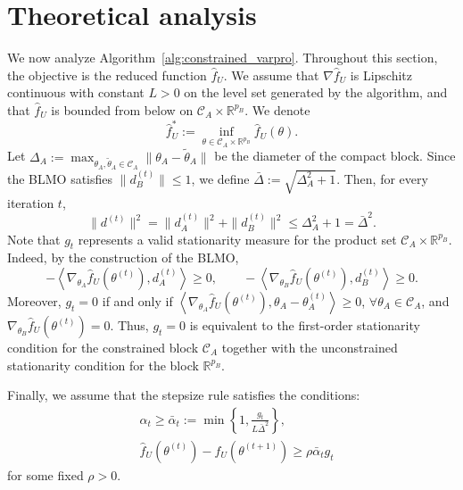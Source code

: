 \documentclass{article}
\begin{document}
\section{Theoretical analysis}
\label{sec:main}
We now analyze Algorithm~\ref{alg:constrained_varpro}. Throughout this section, the objective
is the reduced function \(\widehat f_U\). We assume that \(\nabla \widehat f_U\) is Lipschitz continuous
with constant \(L>0\) on the level set generated by the algorithm, and that \(\widehat f_U\) is
bounded from below on \(\mathcal C_A\times \mathbb{R}^{p_B}\). We denote
\[
    \widehat f_U^*
    :=
    \inf_{\theta\in \mathcal C_A\times \mathbb{R}^{p_B}}
    \widehat f_U(\theta).
\]
Let $    \Delta_A:=\max_{\theta_A,\tilde\theta_A\in \mathcal C_A}\|\theta_A-\tilde\theta_A\|$
be the diameter of the compact block. Since the BLMO satisfies $\|d_B^{(t)}\|\le 1$, 
we define $    \bar\Delta := \sqrt{\Delta_A^2+1}$.
Then, for every iteration \(t\),
\[
    \|d^{(t)}\|^2
    =
    \|d_A^{(t)}\|^2+\|d_B^{(t)}\|^2
    \le
    \Delta_A^2+1
    =
    \bar\Delta^2.
\] 
Note that $g_t$ represents a valid stationarity measure for the product set
\(\mathcal C_A\times \mathbb{R}^{p_B}\). Indeed, by the construction of the BLMO,
\[
    -
    \left\langle
        \nabla_{\theta_A}\widehat f_U(\theta^{(t)}),
        d_A^{(t)}
    \right\rangle
    \ge 0,
    \qquad
    -
    \left\langle
        \nabla_{\theta_B}\widehat f_U(\theta^{(t)}),
        d_B^{(t)}
    \right\rangle
    \ge 0.
\]
Moreover, \(g_t=0\) if and only if $\left\langle
        \nabla_{\theta_A}\widehat f_U(\theta^{(t)}),
        \theta_A-\theta_A^{(t)}
    \right\rangle
    \ge 0$, $\forall \theta_A\in \mathcal C_A$, and $\nabla_{\theta_B}\widehat f_U(\theta^{(t)})=0$.
Thus, \(g_t=0\) is equivalent to the first-order stationarity condition for the constrained
block \(\mathcal C_A\) together with the unconstrained stationarity condition for the block
\(\mathbb{R}^{p_B}\).


Finally, we assume that the stepsize rule satisfies the conditions:
\begin{align}\label{eq:alpha_cond}
    &\alpha_t \geq
    \bar\alpha_t
    :=
    \min\left\{
        1,
        \frac{g_t}{L\bar\Delta^2}
    \right\} ,\\
    \label{eq:sufficient_decrease}
    &\widehat f_U(\theta^{(t)})
    -
    \widehat f_U(\theta^{(t+1)})
    \ge
    \rho \bar\alpha_t g_t
\end{align}
for some fixed \(\rho>0\).
\end{document}
